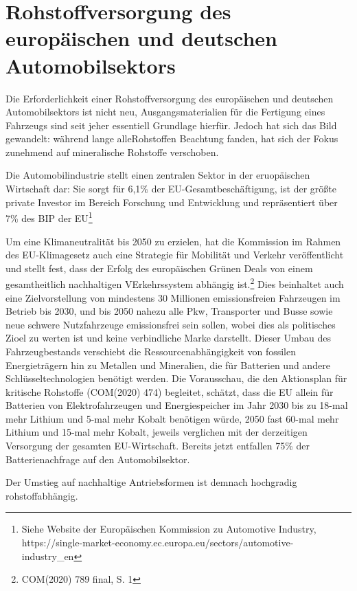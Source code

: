 \documentclass[12pt,a4paper,oneside]{book} %
\begin{document}
{\section{Rohstoffversorgung des europäischen und deutschen Automobilsektors}
	
Die Erforderlichkeit einer Rohstoffversorgung des europäischen und deutschen Automobilsektors ist nicht neu, Ausgangsmaterialien für die Fertigung eines Fahrzeugs sind seit jeher essentiell Grundlage hierfür. Jedoch hat sich das Bild gewandelt: während lange \glqq alle\grqq Rohstoffen Beachtung fanden, hat sich der Fokus zunehmend auf mineralische Rohstoffe verschoben.

Die Automobilindustrie stellt einen zentralen Sektor in der eruopäischen Wirtschaft dar: Sie sorgt für 6,1\% der EU-Gesamtbeschäftigung, ist der  größte private Investor im Bereich Forschung und Entwicklung und repräsentiert über 7\% des BIP der EU\footnote{Siehe Website der Europäischen Kommission zu \glqq Automotive Industry\grqq, https://single-market-economy.ec.europa.eu/sectors/automotive-industry_en}

Um eine Klimaneutralität bis 2050 zu erzielen, hat die Kommission im Rahmen des EU-Klimagesetz auch eine Strategie für Mobilität und Verkehr veröffentlicht und stellt fest, dass der Erfolg des europäischen Grünen Deals von einem gesamtheitlich nachhaltigen VErkehrssystem abhängig ist.\footnote{COM(2020) 789 final, S. 1} Dies beinhaltet auch eine Zielvorstellung von mindestens 30 Millionen emissionsfreien Fahrzeugen im Betrieb bis 2030, und bis 2050 nahezu alle Pkw, Transporter und Busse sowie neue schwere Nutzfahrzeuge emissionsfrei sein sollen, wobei dies als politisches Zioel zu werten ist und keine verbindliche Marke darstellt. Dieser Umbau des Fahrzeugbestands verschiebt die Ressourcenabhängigkeit von fossilen Energieträgern hin zu Metallen und Mineralien, die für Batterien und andere Schlüsseltechnologien benötigt werden. Die Vorausschau, die den Aktionsplan für kritische Rohstoffe (COM(2020) 474) begleitet, schätzt, dass die EU allein für Batterien von Elektrofahrzeugen und Energiespeicher im Jahr 2030 bis zu 18-mal mehr Lithium und 5-mal mehr Kobalt benötigen würde, 2050 fast 60-mal mehr Lithium und 15-mal mehr Kobalt, jeweils verglichen mit der derzeitigen Versorgung der gesamten EU-Wirtschaft. Bereits jetzt entfallen 75\% der Batterienachfrage auf den Automobilsektor.\autocite{S&P Global data; McKinsey Battery Insights; McKinsey Center for Future Mobility data}

Der Umstieg auf nachhaltige Antriebsformen ist demnach hochgradig rohstoffabhängig.

}
\end{document}
